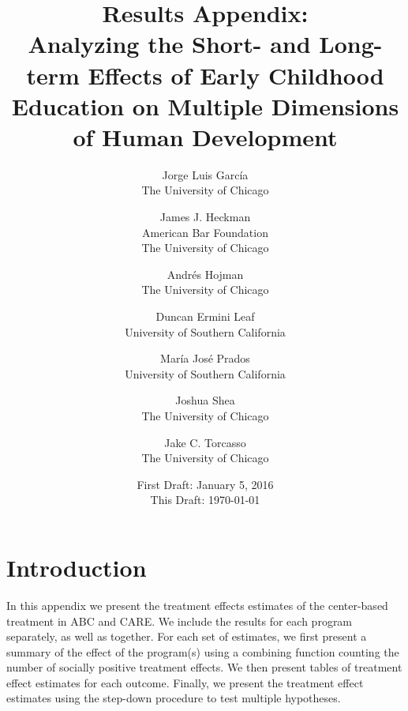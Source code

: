 




\title{\Large \textbf{Results Appendix: \\ Analyzing the Short- and Long-term Effects of Early Childhood Education on Multiple Dimensions of Human Development}}

\author{
Jorge Luis Garc\'{i}a\\
The University of Chicago \and
James J. Heckman \\
American Bar Foundation \\
The University of Chicago \and
Andr\'{e}s Hojman\\
The University of Chicago \and
Duncan Ermini Leaf \\ 
University of Southern California \and
Mar\'{i}a Jos\'{e} Prados \\
University of Southern California \and
Joshua Shea \\
The University of Chicago \and 
Jake C. Torcasso \\
The University of Chicago}
\date{First Draft: January 5, 2016\\ This Draft: \today}
\maketitle
\thispagestyle{empty}

\tableofcontents
\listoftables
\pagebreak
\doublespacing
{}

\section{Introduction}

In this appendix we present the treatment effects estimates of the center-based treatment in ABC and CARE. We include the results for each program separately, as well as together. For each set of estimates, we first present a summary of the effect of the program(s) using a combining function counting the number of socially positive treatment effects. We then present tables of treatment effect estimates for each outcome. Finally, we present the treatment effect estimates using the step-down procedure to test multiple hypotheses.

